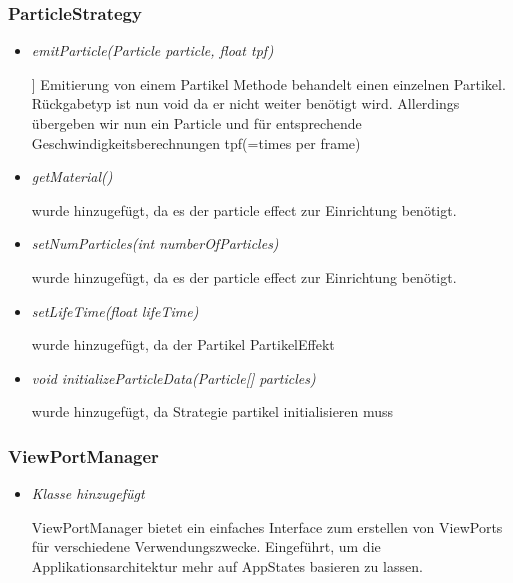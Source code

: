 \subsubsection{ParticleStrategy}
\begin{itemize}
    \item \textit{emitParticle(Particle particle, float tpf)}
    \begin{leftbar}[0.9\linewidth]]
        Emitierung von einem Partikel
        Methode behandelt einen einzelnen Partikel.
        Rückgabetyp ist nun void da er nicht weiter benötigt wird.
        Allerdings übergeben wir nun ein Particle und für entsprechende
        Geschwindigkeitsberechnungen tpf(=times per frame)
    \end{leftbar}

    \item \textit{getMaterial()}
    \begin{leftbar}[0.9\linewidth]
        wurde hinzugefügt, da es der particle effect zur Einrichtung benötigt.
    \end{leftbar}

    \item \textit{setNumParticles(int numberOfParticles)}
    \begin{leftbar}[0.9\linewidth]
        wurde hinzugefügt, da es der particle effect zur Einrichtung benötigt.
    \end{leftbar}

    \item \textit{setLifeTime(float lifeTime)}
    \begin{leftbar}[0.9\linewidth]
        wurde hinzugefügt, da der Partikel PartikelEffekt
    \end{leftbar}

    \item \textit{ void initializeParticleData(Particle[] particles)}
    \begin{leftbar}[0.9\linewidth]
        wurde hinzugefügt, da Strategie partikel initialisieren muss
    \end{leftbar}
\end{itemize}

\subsubsection{ViewPortManager}
\begin{itemize}
    \item \textit{Klasse hinzugefügt}
    \begin{leftbar}[0.9\linewidth]
        ViewPortManager bietet ein einfaches Interface zum erstellen von ViewPorts für
        verschiedene Verwendungszwecke. Eingeführt, um die Applikationsarchitektur mehr
        auf AppStates basieren zu lassen.
    \end{leftbar}
\end{itemize}

